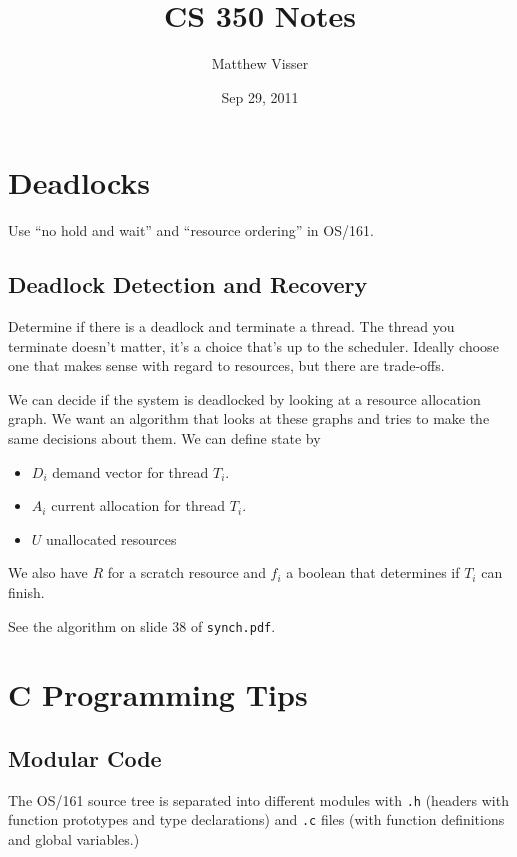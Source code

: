 \documentclass[12pt]{article}
\begin{document}
\title{CS 350 Notes}
\author{Matthew Visser}
\date{Sep 29, 2011}
\maketitle

\section{Deadlocks}

Use ``no hold and wait'' and ``resource ordering'' in OS/161.

\subsection{Deadlock Detection and Recovery}

Determine if there is a deadlock and terminate a thread.  The thread you
terminate doesn't matter, it's a choice that's up to the scheduler. Ideally
choose one that makes sense with regard to resources, but there are trade-offs.

We can decide if the system is deadlocked by looking at a resource allocation
graph. We want an algorithm that looks at these graphs and tries to make the
same decisions about them. We can define state by
\begin{itemize}
    \item $D_i$ demand vector for thread $T_i$.
    \item $A_i$ current allocation for thread $T_i$.
    \item $U$ unallocated resources
\end{itemize}
We also have $R$ for a scratch resource and $f_i$ a boolean that determines if
$T_i$ can finish.

See the algorithm on slide 38 of \texttt{synch.pdf}.

\section{C Programming Tips}

\subsection{Modular Code}

The OS/161 source tree is separated into different modules with
\texttt{.h} (headers with function prototypes and type declarations) and
\texttt{.c} files (with function definitions and global variables.)
\end{document}
